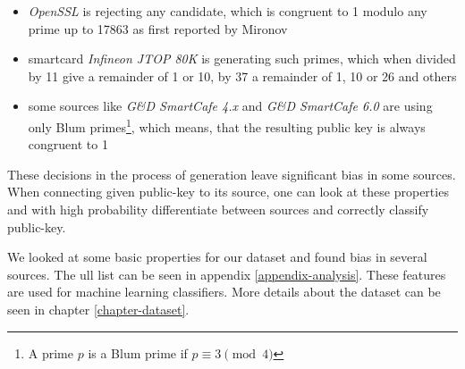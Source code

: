 \begin{itemize}

\item \textit{OpenSSL} is rejecting any candidate, which is congruent to 1 modulo any prime up to 17863 as first reported by Mironov\cite{mironov}

\item smartcard \textit{Infineon JTOP 80K} is generating such primes, which when divided by 11 give a remainder of 1 or 10, by 37 a remainder of 1, 10 or 26 and others

\item some sources like \textit{G\&D SmartCafe 4.x} and \textit{G\&D SmartCafe 6.0} are using only Blum primes\footnote{A prime $p$ is a Blum prime if $p \equiv 3 \pmod{4}$}, which means, that the resulting public key is always congruent to 1

\end{itemize}

These decisions in the process of generation leave significant bias in some sources. When connecting given public-key to its source, one can look at these properties and with high probability differentiate between sources and correctly classify public-key.

We looked at some basic properties for our dataset and found bias in several sources. The ull list can be seen in appendix \ref{appendix-analysis}. These features are used for machine learning classifiers. More details about the dataset can be seen in chapter \ref{chapter-dataset}.
